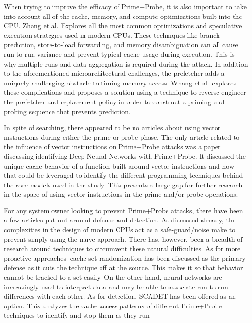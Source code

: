 \documentclass[article]{IEEEtran}
\begin{document}
When trying to improve the efficacy of Prime+Probe, it is also important to take into account all of the cache, memory, and compute optimizations built-into the CPU. Zhang et al. Explores all the most common optimizations and speculative execution strategies used in modern CPUs\cite{10.1145/3645109}. These techniques like branch prediction, store-to-load forwarding, and memory disambiguation can all cause run-to-run variance and prevent typical cache usage during execution. This is why multiple runs and data aggregation is required during the attack. In addition to the aforementioned microarchitectural challenges, the prefetcher adds a uniquely challenging obstacle to timing memory access. Whang et al. explores these complications and proposes a solution using a technique to reverse engineer the prefetcher and replacement policy in order to construct a priming and probing sequence that prevents prediction\cite{10.1145/3316781.3317877}.

In spite of searching, there appeared to be no articles about using vector instructions during either the prime or probe phase. The only article related to the influence of vector instructions on Prime+Probe attacks was a paper discussing identifying Deep Neural Networks with Prime+Probe. It discussed the unique cache behavior of a function built around vector instructions and how that could be leveraged to identify the different programming techniques behind the core models used in the study\cite{10.1145/3658644.3690241}. This presents a large gap for further research in the space of using vector instructions in the prime and/or probe operations.

For any system owner looking to prevent Prime+Probe attacks, there have been a few articles put out around defense and detection. As discussed already, the complexities in the design of modern CPUs act as a safe-guard/noise make to prevent simply using the naive approach. There has, however, been a breadth of research around techniques to circumvent these natural difficulties\cite{Kaur2021}. As for more proactive approaches, cache set randomization has been discussed as the primary defense as it cuts the technique off at the source\cite{236344}. This makes it so that behavior cannot be tracked to a set easily. On the other hand, neural networks are increasingly used to interpret data and may be able to associate run-to-run differences with each other. As for detection, SCADET has been offered as an option. This analyzes the cache access patterns of different Prime+Probe techniques to identify and stop them as they run\cite{10.1145/3240765.3240844}
\end{document}
